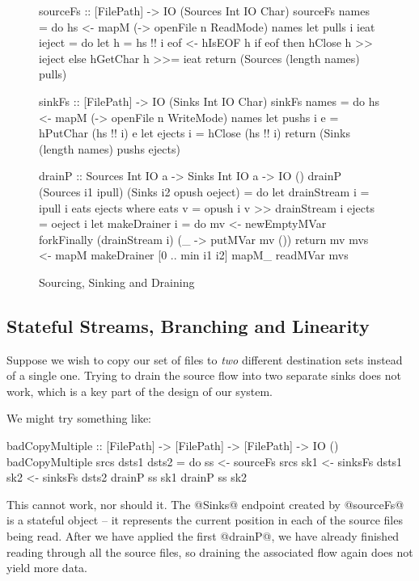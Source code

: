 \begin{figure}
\begin{code}
sourceFs :: [FilePath] -> IO (Sources Int IO Char)
sourceFs names = do
 hs <- mapM (\n -> openFile n ReadMode) names
 let pulls i ieat ieject
      = do let h = hs !! i
           eof <- hIsEOF h
           if eof then hClose   h >> ieject
                  else hGetChar h >>= ieat
 return (Sources (length names) pulls)

sinkFs  :: [FilePath] -> IO (Sinks Int IO Char)
sinkFs names = do
 hs <- mapM (\n -> openFile n WriteMode) names
 let pushs  i e = hPutChar (hs !! i) e
 let ejects i   = hClose   (hs !! i)
 return (Sinks (length names) pushs ejects)

drainP :: Sources Int IO a -> Sinks Int IO a -> IO ()
drainP (Sources i1 ipull) 
       (Sinks   i2 opush oeject) = do
 let drainStream i
      = ipull i eats ejects 
      where eats   v = opush  i v >> drainStream i
            ejects   = oeject i
 let makeDrainer i = do
        mv <- newEmptyMVar 
        forkFinally (drainStream i) 
                    (\_ -> putMVar mv ())
        return mv 
 mvs <- mapM makeDrainer [0 .. min i1 i2]
 mapM_ readMVar mvs
\end{code}

\caption{Sourcing, Sinking and Draining}
\label{f:Draining}
\end{figure}


\subsection{Stateful Streams, Branching and Linearity}

Suppose we wish to copy our set of files to \emph{two} different destination sets instead of a single one. Trying to drain the source flow into two separate sinks does not work, which is a key part of the design of our system. 

\eject 
We might try something like:

\begin{code}
 badCopyMultiple 
  :: [FilePath] -> [FilePath] -> [FilePath] -> IO ()
 badCopyMultiple srcs dsts1 dsts2
  = do  ss  <- sourceFs srcs
        sk1 <- sinksFs  dsts1
        sk2 <- sinksFs  dsts2
        drainP ss sk1
        drainP ss sk2
\end{code}

This cannot work, nor should it. The @Sinks@ endpoint created by @sourceFs@ is a stateful object -- it represents the current position in each of the source files being read. After we have applied the first @drainP@, we have already finished reading through all the source files, so draining the associated flow again does not yield more data. 

